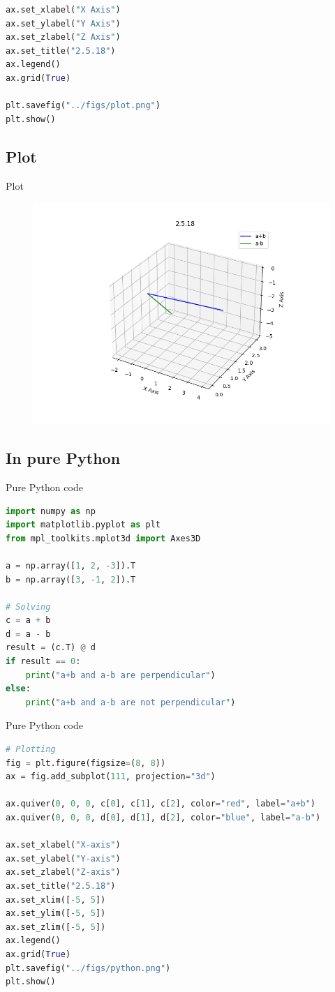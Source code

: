 \documentclass{beamer}
\theoremstyle{remark}
\numberwithin{equation}{section}
\begin{document}
\begin{frame}[fragile]
 \begin{lstlisting}[language=Python]
ax.set_xlabel("X Axis")
ax.set_ylabel("Y Axis")
ax.set_zlabel("Z Axis")
ax.set_title("2.5.18")
ax.legend()
ax.grid(True)

plt.savefig("../figs/plot.png")
plt.show()
 \end{lstlisting}
\end{frame}
\subsection{Plot}
\begin{frame}{Plot}
 \begin{figure}[H]
    \centering
    \includegraphics[width=0.8\columnwidth]{../figs/plot.png}
    \caption*{}
    \label{fig:plot}
\end{figure}
\end{frame}
\subsection{In pure Python}
\begin{frame}[fragile]{Pure Python code}
 \begin{lstlisting}[language=Python]
import numpy as np
import matplotlib.pyplot as plt
from mpl_toolkits.mplot3d import Axes3D

a = np.array([1, 2, -3]).T
b = np.array([3, -1, 2]).T

# Solving
c = a + b
d = a - b
result = (c.T) @ d
if result == 0:
    print("a+b and a-b are perpendicular")
else:
    print("a+b and a-b are not perpendicular")
 \end{lstlisting}
\end{frame}
\begin{frame}[fragile]{Pure Python code}
 \begin{lstlisting}[language=Python]
# Plotting
fig = plt.figure(figsize=(8, 8))
ax = fig.add_subplot(111, projection="3d")

ax.quiver(0, 0, 0, c[0], c[1], c[2], color="red", label="a+b")
ax.quiver(0, 0, 0, d[0], d[1], d[2], color="blue", label="a-b")

ax.set_xlabel("X-axis")
ax.set_ylabel("Y-axis")
ax.set_zlabel("Z-axis")
ax.set_title("2.5.18")
ax.set_xlim([-5, 5])
ax.set_ylim([-5, 5])
ax.set_zlim([-5, 5])
ax.legend()
ax.grid(True)
plt.savefig("../figs/python.png")
plt.show()
 \end{lstlisting}
\end{frame}
\end{document}
